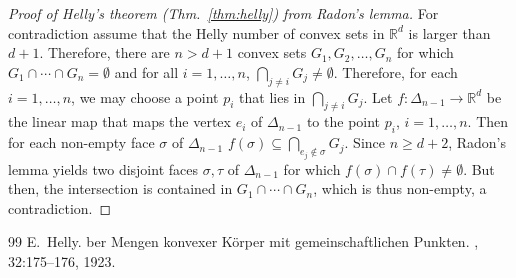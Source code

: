 \documentclass[10pt,a4paper]{amsart}
\newcommand{\R}{\mathbb{R}} 	%
\begin{document}
\begin{proof}[Proof of Helly's theorem (Thm.~\ref{thm:helly}) from Radon's lemma]
For contradiction assume that the Helly number of convex sets in $\R^d$ is larger than $d+1$. Therefore, there are $n>d+1$ convex sets $G_1,G_2,\ldots, G_n$ for which $G_1\cap\cdots\cap G_n=\emptyset$ and for all $i=1,\ldots, n$, $\bigcap_{j\neq i}G_j\neq\emptyset$. Therefore, for each $i=1,\ldots, n$, we may choose a point $p_i$ that lies in $\bigcap_{j\neq i}G_j$.
Let $f\colon \Delta_{n-1}\to \R^d$ be the linear map that maps the vertex $e_i$ of $\Delta_{n-1}$ to the point $p_i$, $i=1,\ldots, n$.
Then for each non-empty face $\sigma$ of $\Delta_{n-1}$
$f(\sigma)\subseteq \bigcap_{e_j\notin \sigma}G_j$.
Since $n\geq d+2$, Radon's lemma yields two disjoint faces $\sigma,\tau$ of $\Delta_{n-1}$ for which
$f(\sigma)\cap f(\tau)\neq\emptyset$.
But then, the intersection is contained in $G_1\cap \cdots\cap G_n$, which is thus non-empty, a contradiction.
\end{proof}

\begin{thebibliography}{99}
 E.~Helly. ber {Mengen} konvexer {K{\"o}rper} mit gemeinschaftlichen {Punkten}. , 32:175--176, 1923.
\end{thebibliography}
\end{document}
